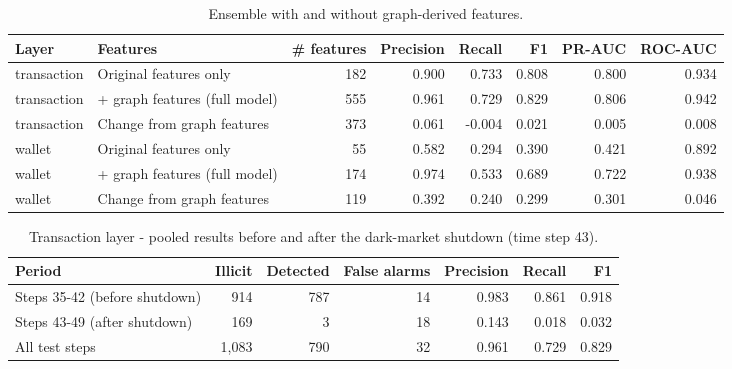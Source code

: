 \begin{table}[t]
\centering
\caption{Ensemble with and without graph-derived features.}
\label{tab:ablation}
\begin{tabular}{llrrrrrr}
\toprule
Layer & Features & \# features & Precision & Recall & F1 & PR-AUC & ROC-AUC \\
\midrule
transaction & Original features only & 182 & 0.900 & 0.733 & 0.808 & 0.800 & 0.934 \\
transaction & + graph features (full model) & 555 & 0.961 & 0.729 & 0.829 & 0.806 & 0.942 \\
transaction & Change from graph features & 373 & 0.061 & -0.004 & 0.021 & 0.005 & 0.008 \\
wallet & Original features only & 55 & 0.582 & 0.294 & 0.390 & 0.421 & 0.892 \\
wallet & + graph features (full model) & 174 & 0.974 & 0.533 & 0.689 & 0.722 & 0.938 \\
wallet & Change from graph features & 119 & 0.392 & 0.240 & 0.299 & 0.301 & 0.046 \\
\bottomrule
\end{tabular}
\end{table}

\begin{table}[t]
\centering
\caption{Transaction layer - pooled results before and after the dark-market shutdown (time step 43).}
\label{tab:drift}
\begin{tabular}{lrrrrrr}
\toprule
Period & Illicit & Detected & False alarms & Precision & Recall & F1 \\
\midrule
Steps 35-42 (before shutdown) & 914 & 787 & 14 & 0.983 & 0.861 & 0.918 \\
Steps 43-49 (after shutdown) & 169 & 3 & 18 & 0.143 & 0.018 & 0.032 \\
All test steps & 1,083 & 790 & 32 & 0.961 & 0.729 & 0.829 \\
\bottomrule
\end{tabular}
\end{table}

